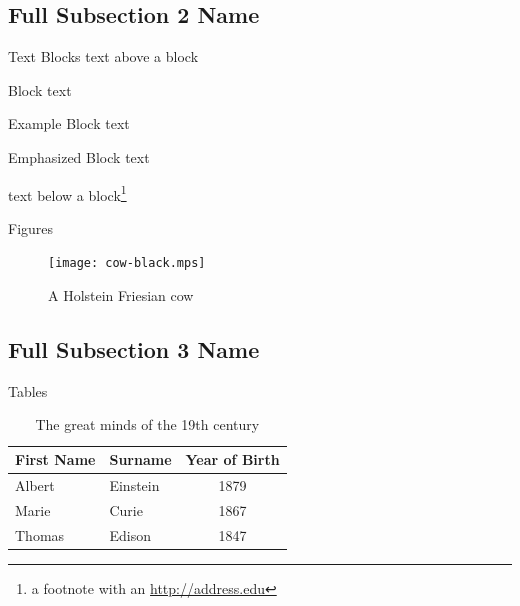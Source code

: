 \subsection[Short Subsection 2 Name]{Full Subsection 2 Name}

\begin{frame}{Text Blocks}
text above a block
\begin{block}{Block}
  text
\end{block}
\begin{exampleblock}{Example Block}
  text
\end{exampleblock}
\begin{alertblock}{Emphasized Block}
  text
\end{alertblock}
text below a block\footnote{a footnote with an \url{http://address.edu}}
\end{frame}

\begin{frame}{Figures}
\begin{figure}
  \texttt{[image: cow-black.mps]}
  \caption{A Holstein Friesian cow}
\end{figure}
\end{frame}

\subsection[Short Subsection 3 Name]{Full Subsection 3 Name}

\begin{frame}{Tables}
\begin{table}
  \begin{tabular}{llc}
    First Name & Surname & Year of Birth \\ \midrule
    Albert & Einstein & 1879 \\
    Marie & Curie & 1867 \\
    Thomas & Edison & 1847 \\
  \end{tabular}
  \caption{The great minds of the 19th century}
\end{table}
\end{frame}

